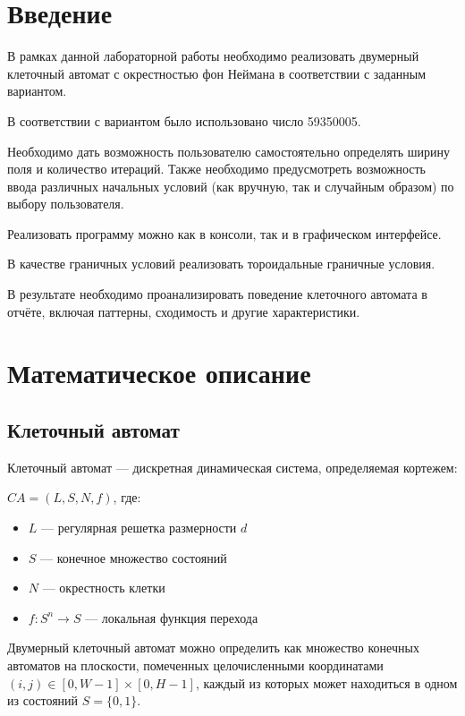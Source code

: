 \documentclass[11pt,a4paper,final]{article}
\begin{document}
	
	\newpage
	\tableofcontents
	
	\newpage
	\section* {Введение}
	В рамках данной лабораторной работы необходимо реализовать двумерный клеточный автомат с окрестностью фон Неймана в соответствии с заданным вариантом.
	
	\par В соответствии с вариантом было использовано число 59350005.
	\par Необходимо дать возможность пользователю самостоятельно определять ширину поля и количество итераций. Также необходимо предусмотреть возможность ввода различных начальных условий (как вручную, так и случайным образом) по выбору пользователя.
	\par Реализовать программу можно как в консоли, так и в графическом интерфейсе.
	\par В качестве граничных условий реализовать тороидальные граничные условия. 
	\par В результате необходимо проанализировать поведение клеточного автомата в отчёте, включая паттерны, сходимость и другие характеристики.
	
	\newpage
	\section{Математическое описание}
	
	\subsection{Клеточный автомат} 
	Клеточный автомат — дискретная динамическая система, определяемая кортежем:
	\begin{center}
	$CA = (L, S, N, f)$, где:
	\end{center}
	\begin{itemize}
		\item $L$ — регулярная решетка размерности $d$
		\item $S$ — конечное множество состояний
		\item $N$ — окрестность клетки
		\item $f: S^n \rightarrow S$ — локальная функция перехода
	\end{itemize}
	
	Двумерный клеточный автомат можно определить как множество конечных автоматов на плоскости, помеченных целочисленными координатами $(i, j) \in [0, W-1] \times [0, H-1]$, каждый из которых может находиться в одном из состояний $S = \{0, 1\}$.
	
\end{document}
